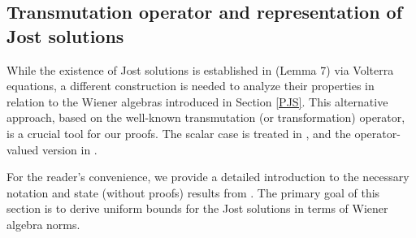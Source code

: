\documentclass[12pt,oneside,onecolumn,open]{article}
\begin{document}
\subsection{Transmutation operator and representation of Jost solutions}
\color{black}
While the existence of Jost solutions is established in \cite{MR4385984} (Lemma 7) via Volterra equations, a different construction is needed to analyze their properties in relation to the Wiener algebras introduced in Section \ref{PJS}. This alternative approach, based on the well-known transmutation (or transformation) operator, is a crucial tool for our proofs. The scalar case is treated in \cite{MR3433284}, and the operator-valued version in \cite{sher2025scatteringtheorydifferenceequations}.

For the reader's convenience, we provide a detailed introduction to the necessary notation and state (without proofs) results from   \cite{sher2025scatteringtheorydifferenceequations}. The primary goal of this section is to derive uniform bounds for the Jost solutions in terms of Wiener algebra norms.
\end{document}
